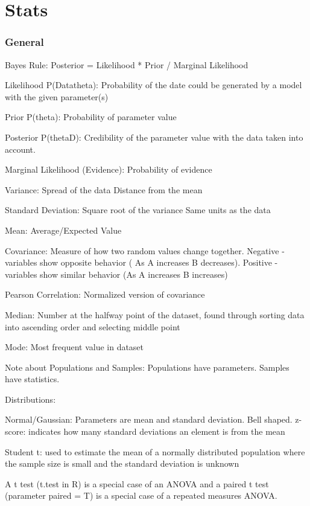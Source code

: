 \documentclass[]{book}
\theoremstyle{definition}
\theoremstyle{definition}
\theoremstyle{definition}
\theoremstyle{remark}
\begin{document}
\chapter{Stats}\label{stats}

\subsection{General}\label{general-7}

Bayes Rule: Posterior = Likelihood * Prior / Marginal Likelihood

Likelihood P(Data\textbar{}theta): Probability of the date could be
generated by a model with the given parameter(s)

Prior P(theta): Probability of parameter value

Posterior P(theta\textbar{}D): Credibility of the parameter value with
the data taken into account.

Marginal Likelihood (Evidence): Probability of evidence

Variance: Spread of the data \textbar{} Distance from the mean

Standard Deviation: Square root of the variance \textbar{} Same units as
the data

Mean: Average/Expected Value

Covariance: Measure of how two random values change together. Negative -
variables show opposite behavior ( As A increases B decreases). Positive
- variables show similar behavior (As A increases B increases)

Pearson Correlation: Normalized version of covariance

Median: Number at the halfway point of the dataset, found through
sorting data into ascending order and selecting middle point

Mode: Most frequent value in dataset

Note about Populations and Samples: Populations have parameters. Samples
have statistics.

Distributions:

Normal/Gaussian: Parameters are mean and standard deviation. Bell
shaped. z-score: indicates how many standard deviations an element is
from the mean

Student t: used to estimate the mean of a normally distributed
population where the sample size is small and the standard deviation is
unknown

A t test (t.test in R) is a special case of an ANOVA and a paired t test
(parameter paired = T) is a special case of a repeated measures ANOVA.
\end{document}
